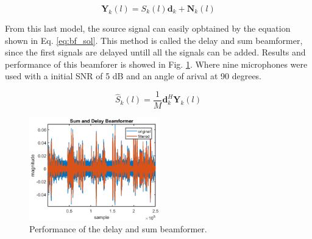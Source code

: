 \begin{equation}
  \mathbf{Y}_{k}(l) = S_{k}(l)\mathbf{d}_{k} + \mathbf{N}_{k}(l)
  \label{eq:bf_model}
\end{equation}

From this last model, the source signal can easily opbtained by the equation shown in Eq. \ref{eq:bf_sol}. This method is called the delay and sum beamformer, since the first signals are delayed untill all the signals can be added. Results and performance of this beamforer is showed in Fig. \ref{fig:bf}. Where nine microphones were used with a initial SNR of 5 dB and an angle of arival at 90 degrees.

\begin{equation}
   \hat S_{k}(l) =\frac{1}{M} \mathbf{d}_{k}^{H}\mathbf{Y}_{k}(l)
  \label{eq:bf_sol}
\end{equation}

\begin{figure}
  \centering
  \includegraphics[width=0.5\textwidth]{images/beamformer_sum_delay.png}
  \caption{Performance of the delay and sum beamformer.}
  \label{fig:bf}
\end{figure}
